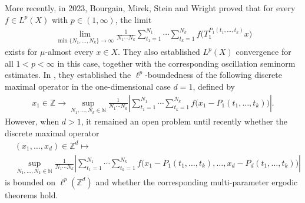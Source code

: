 \documentclass[11 pt,letterpaper]{amsart}
\theoremstyle{plain}
\theoremstyle{definition}
\theoremstyle{remark} \theoremstyle{exam} \theoremstyle{ob}
\numberwithin{equation}{section}
\begin{document}
More recently, in 2023, Bourgain, Mirek, Stein and Wright \cite{B4}  proved that for every
$f\in L^p(X)$ with $p\in(1,\infty)$, the limit
\begin{align*}
\lim_{\min\{N_1,\dots,N_k\}\to\infty}	\frac{1}{N_1\cdots N_k}
\sum_{t_1=1}^{N_1}\cdots\sum_{t_k=1}^{N_k}
	f\bigl(T_1^{P_1(t_1,\dots,t_k)}x\bigr)
\end{align*}
exists for $\mu$-almost every $x\in X$.
They also established $L^p(X)$ convergence for all $1<p<\infty$ in this case, together with
the corresponding oscillation seminorm estimates. In \cite{B4}, they established the $\ell^p$-boundedness of the following discrete maximal operator in the one-dimensional case $d=1$, defined by
\begin{align*}
	x_1\in\mathbb{Z}\rightarrow \sup_{N_1,\dots,N_k\in\mathbb{N}}
	\frac{1}{N_1\cdots N_k}\left|
\sum_{t_1=1}^{N_1}\cdots\sum_{t_k=1}^{N_k}
	f\bigl(x_1 - P_1(t_1,\dots,t_k)\bigr)\right|.
\end{align*}
However, when $d>1$, it remained an open problem until recently whether the discrete maximal operator
\begin{align*}
	&(x_1,\dots,x_d)\in\mathbb{Z}^{d}\longmapsto\\
	&\sup_{N_1,\dots,N_k\in\mathbb{N}}
	\frac{1}{N_1\cdots N_k}
	\left|\sum_{t_1=1}^{N_1}\cdots\sum_{t_k=1}^{N_k}
	f\bigl(x_1-P_1(t_1,\dots,t_k),\dots,
	x_d-P_d(t_1,\dots,t_k)\bigr)\right|
\end{align*}
is bounded on $\ell^p(\mathbb{Z}^d)$ and whether the corresponding multi-parameter ergodic theorems hold.
\end{document}
